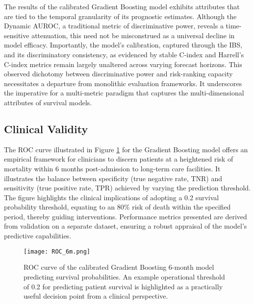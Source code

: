 \documentclass{article}
\begin{document}
The results of the calibrated Gradient Boosting model exhibits attributes that are tied to the temporal granularity of its prognostic estimates. Although the Dynamic AUROC, a traditional metric of discriminative power, reveals a time-sensitive attenuation, this need not be misconstrued as a universal decline in model efficacy. Importantly, the model's calibration, captured through the IBS, and its discriminatory consistency, as evidenced by stable C-index and Harrell's C-index metrics remain largely unaltered across varying forecast horizons. This observed dichotomy between discriminative power and risk-ranking capacity necessitates a departure from monolithic evaluation frameworks. It underscores the imperative for a multi-metric paradigm that captures the multi-dimensional attributes of survival models.


\subsection{Clinical Validity}

The ROC curve illustrated in Figure \ref{fig:roc6m} for the Gradient Boosting model offers an empirical framework for clinicians to discern patients at a heightened risk of mortality within 6 months post-admission to long-term care facilities. It illustrates the balance between specificity (true negative rate, TNR) and sensitivity (true positive rate, TPR) achieved by varying the prediction threshold. The figure highlights the clinical implications of adopting a 0.2 survival probability threshold, equating to an 80\% risk of death within the specified period, thereby guiding interventions. Performance metrics presented are derived from validation on a separate dataset, ensuring a robust appraisal of the model's predictive capabilities.

\begin{figure}[hbt]
    \centering
    \texttt{[image: ROC\_6m.png]}
    \caption{ROC curve of the calibrated Gradient Boosting 6-month model predicting survival probabilities. An example operational threshold of 0.2 for predicting patient survival is highlighted as a practically useful decision point from a clinical perspective.}
    \label{fig:roc6m}
\end{figure}
\end{document}
